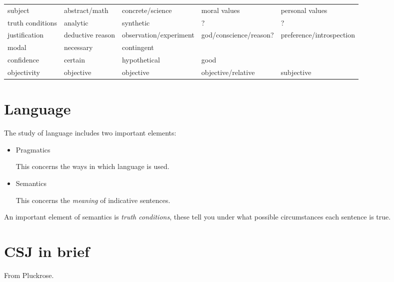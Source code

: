 \documentclass[10pt,titlepage]{book}
\begin{document}
{\begin{table}[h!]
\centering
 
\begin{tabular}{p{1cm} | p{1cm} p{1cm} p{1cm} p{1cm}}
  subject & abstract/math & concrete/science & moral values & personal values \\

  truth conditions & analytic & synthetic & ? & ? \\
  justification & deductive reason &  observation/experiment & god/conscience/reason? & preference/introspection \\
  modal & necessary &  contingent & \\
  confidence & certain & hypothetical &  good & \\
  objectivity &  objective & objective & objective/relative & subjective\\
  \end{tabular}
\end{table}

\section{Language}

The study of language includes two important elements:

\begin{itemize}
\item Pragmatics

  This concerns the ways in which language is used.
  
\item Semantics

  This concerns the \emph{meaning} of indicative sentences.
  
\end{itemize}

An important element of semantics is \emph{truth conditions}, these tell you under what possible circumstances each sentence is true.

}%

\section{CSJ in brief}

From Pluckrose\cite{pluckrose-evolution}.
\end{document}
